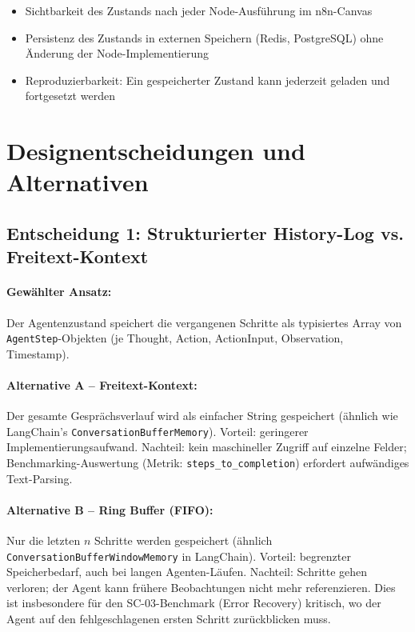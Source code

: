 \documentclass[12pt,a4paper,oneside]{report}
\begin{document}
\begin{itemize}
  \item Sichtbarkeit des Zustands nach jeder Node-Ausführung im n8n-Canvas
  \item Persistenz des Zustands in externen Speichern (Redis, PostgreSQL) ohne
    Änderung der Node-Implementierung
  \item Reproduzierbarkeit: Ein gespeicherter Zustand kann jederzeit geladen und
    fortgesetzt werden
\end{itemize}

\section{Designentscheidungen und Alternativen}

\subsection{Entscheidung 1: Strukturierter History-Log vs. Freitext-Kontext}

\paragraph{Gewählter Ansatz:}
Der Agentenzustand speichert die vergangenen Schritte als typisiertes Array von
\texttt{AgentStep}-Objekten (je Thought, Action, ActionInput, Observation, Timestamp).

\paragraph{Alternative A -- Freitext-Kontext:}
Der gesamte Gesprächsverlauf wird als einfacher String gespeichert (ähnlich wie
LangChain's \texttt{ConversationBufferMemory}). Vorteil: geringerer Implementierungsaufwand.
Nachteil: kein maschineller Zugriff auf einzelne Felder; Benchmarking-Auswertung
(Metrik: \texttt{steps\_to\_completion}) erfordert aufwändiges Text-Parsing.

\paragraph{Alternative B -- Ring Buffer (FIFO):}
Nur die letzten $n$ Schritte werden gespeichert (ähnlich
\texttt{ConversationBufferWindowMemory} in LangChain). Vorteil: begrenzter
Speicherbedarf, auch bei langen Agenten-Läufen. Nachteil: Schritte gehen verloren;
der Agent kann frühere Beobachtungen nicht mehr referenzieren. Dies ist insbesondere
für den SC-03-Benchmark (Error Recovery) kritisch, wo der Agent auf den fehlgeschlagenen
ersten Schritt zurückblicken muss.
\end{document}
